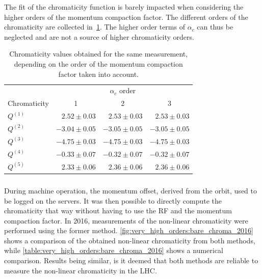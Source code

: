 The fit of the chromaticity function is barely impacted when considering the higher orders of the 
momentum compaction factor. The different orders of the chromaticity are collected
in~\cref{table:decapoles:chromaticity:alpha_c_chroma}.
The higher order terms of $\alpha_c$ can thus be neglected and are not a source of higher
chromaticity orders.

\begin{table}[!htb]
    \centering
    \begin{tabular}{lrrr}
      \toprule
                  & \multicolumn{3}{c}{$\alpha_c$ order} \\
      Chromaticity &  \multicolumn{1}{c}{1}  &  \multicolumn{1}{c}{2} &  \multicolumn{1}{c}{3} \\
      \midrule
      $Q^{(1)}$ & $ 2.52 \pm 0.03$ & $ 2.53 \pm 0.03$ & $ 2.53 \pm 0.03$ \\
      $Q^{(2)}$ & $-3.04 \pm 0.05$ & $-3.05 \pm 0.05$ & $-3.05 \pm 0.05$ \\
      $Q^{(3)}$ & $-4.75 \pm 0.03$ & $-4.75 \pm 0.03$ & $-4.75 \pm 0.03$ \\
      $Q^{(4)}$ & $-0.33 \pm 0.07$ & $-0.32 \pm 0.07$ & $-0.32 \pm 0.07$ \\
      $Q^{(5)}$ & $ 2.33 \pm 0.06$ & $ 2.36 \pm 0.06$ & $ 2.36 \pm 0.06$ \\
      \bottomrule
    \end{tabular}
    \caption{Chromaticity values obtained for the same measurement, depending on the order of the
    momentum compaction factor taken into account.}
    \label{table:decapoles:chromaticity:alpha_c_chroma}
\end{table}     

\subsubsection{}

During machine operation, the momentum offset, derived from the orbit, used to be logged on the
servers. It was then possible to directly compute the chromaticity that way without having to use
the RF and the momentum compaction factor.
In 2016, measurements of the non-linear chromaticity were performed using the former method.
\cref{fig:very_high_orders:bare_chroma_2016} shows a comparison of the obtained non-linear 
chromaticity from both methods, while \cref{table:very_high_orders:bare_chroma_2016} shows a
numerical comparison. Results being similar, is it deemed that both methods are reliable to measure
the non-linear chromaticity in the LHC.

